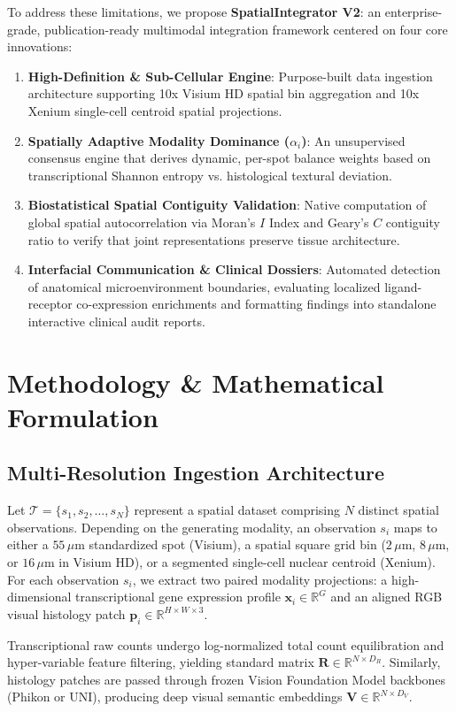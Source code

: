 \documentclass[journal,10pt,twocolumn]{IEEEtran}
\begin{document}
To address these limitations, we propose \textbf{SpatialIntegrator V2}: an enterprise-grade, publication-ready multimodal integration framework centered on four core innovations:
\begin{enumerate}
    \item \textbf{High-Definition \& Sub-Cellular Engine}: Purpose-built data ingestion architecture supporting 10x Visium HD spatial bin aggregation and 10x Xenium single-cell centroid spatial projections.
    \item \textbf{Spatially Adaptive Modality Dominance ($\alpha_i$)}: An unsupervised consensus engine that derives dynamic, per-spot balance weights based on transcriptional Shannon entropy vs. histological textural deviation.
    \item \textbf{Biostatistical Spatial Contiguity Validation}: Native computation of global spatial autocorrelation via Moran's $I$ Index and Geary's $C$ contiguity ratio to verify that joint representations preserve tissue architecture.
    \item \textbf{Interfacial Communication & Clinical Dossiers}: Automated detection of anatomical microenvironment boundaries, evaluating localized ligand-receptor co-expression enrichments and formatting findings into standalone interactive clinical audit reports.
\end{enumerate}

\section{Methodology & Mathematical Formulation}

\subsection{Multi-Resolution Ingestion Architecture}
Let $\mathcal{T} = \{s_1, s_2, \dots, s_N\}$ represent a spatial dataset comprising $N$ distinct spatial observations. Depending on the generating modality, an observation $s_i$ maps to either a $55\,\mu\text{m}$ standardized spot (Visium), a spatial square grid bin ($2\,\mu\text{m}$, $8\,\mu\text{m}$, or $16\,\mu\text{m}$ in Visium HD), or a segmented single-cell nuclear centroid (Xenium). For each observation $s_i$, we extract two paired modality projections: a high-dimensional transcriptional gene expression profile $\mathbf{x}_i \in \mathbb{R}^{G}$ and an aligned RGB visual histology patch $\mathbf{p}_i \in \mathbb{R}^{H \times W \times 3}$.

Transcriptional raw counts undergo log-normalized total count equilibration and hyper-variable feature filtering, yielding standard matrix $\mathbf{R} \in \mathbb{R}^{N \times D_R}$. Similarly, histology patches are passed through frozen Vision Foundation Model backbones (Phikon or UNI), producing deep visual semantic embeddings $\mathbf{V} \in \mathbb{R}^{N \times D_V}$.
\end{document}

